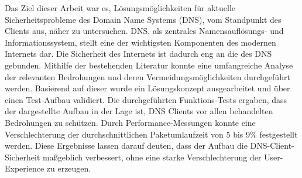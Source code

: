 
Das Ziel dieser Arbeit war es, Lösungsmöglichkeiten für aktuelle Sicherheitsprobleme des Domain Name Systems (DNS), vom Standpunkt des Clients aus, näher zu untersuchen. DNS, als zentrales Namensauflösungs- und Informationssystem, stellt eine der wichtigsten Komponenten des modernen Internets dar. Die Sicherheit des Internets ist dadurch eng an die des DNS gebunden. Mithilfe der bestehenden Literatur konnte eine umfangreiche Analyse der relevanten Bedrohungen und deren Vermeidungsmöglichkeiten durchgeführt werden. Basierend auf dieser wurde ein Lösungskonzept ausgearbeitet und über einen Test-Aufbau validiert. Die durchgeführten Funktions-Tests ergaben, dass der dargestellte Aufbau in der Lage ist, DNS Clients vor allen behandelten Bedrohungen zu schützen. Durch Performance-Messungen konnte eine Verschlechterung der durchschnittlichen Paketumlaufzeit von 5 bis 9\% festgestellt werden. Diese Ergebnisse lassen darauf deuten, dass der Aufbau die DNS-Client-Sicherheit maßgeblich verbessert, ohne eine starke Verschlechterung der User-Experience zu erzeugen.
